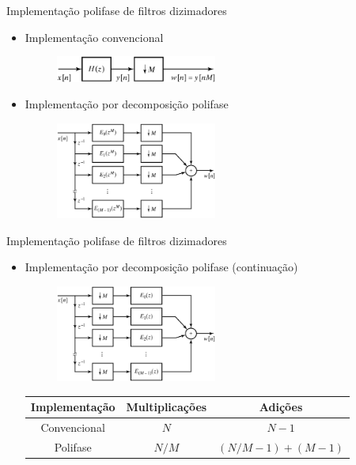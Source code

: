 \begin{slide}{Implementação polifase de filtros dizimadores}
	\begin{itemize}
		\item Implementação convencional
			\begin{figure}
				\centering
				\includegraphics[width=0.5\textwidth]{figs/4-38.eps}
			\end{figure}
		\item Implementação por decomposição polifase
			\begin{figure}
				\centering
				\includegraphics[width=0.5\textwidth]{figs/4-39.eps}
			\end{figure}
	\end{itemize}
\end{slide}

\begin{slide}{Implementação polifase de filtros dizimadores}
	\begin{itemize}
		\item Implementação por decomposição polifase (continuação)
			\begin{figure}
				\centering
				\includegraphics[width=0.5\textwidth]{figs/4-40.eps}
			\end{figure}
			\begin{table}
				\begin{tabular}[h]{c|c|c}
					\hline
					Implementação & Multiplicações & Adições\\
				        \hline	
					Convencional &   $N$ & $N-1$ \\
					Polifase     & $N/M$ & $(N/M -1 )+(M-1)$\\
					\hline
				\end{tabular}
			\end{table}
	\end{itemize}
\end{slide}

